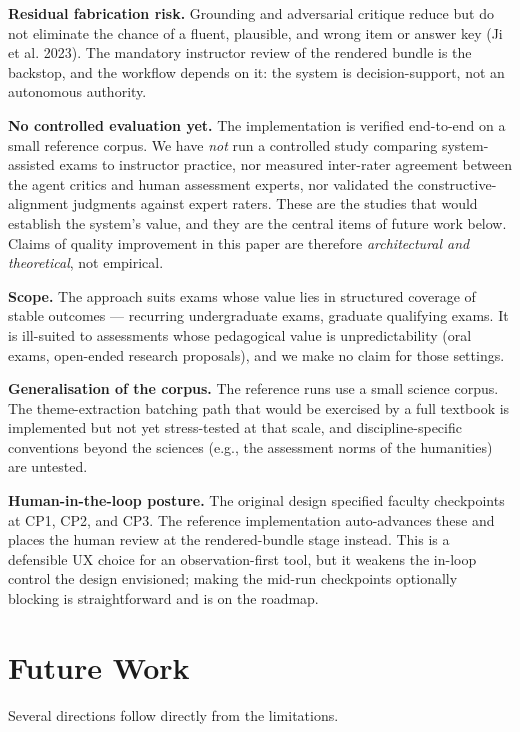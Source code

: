 \documentclass[
  11pt,
  letterpaper,
]{article}
\begin{document}
\textbf{Residual fabrication risk.} Grounding and adversarial critique
reduce but do not eliminate the chance of a fluent, plausible, and wrong
item or answer key (Ji et al. 2023). The mandatory instructor review of
the rendered bundle is the backstop, and the workflow depends on it: the
system is decision-support, not an autonomous authority.

\textbf{No controlled evaluation yet.} The implementation is verified
end-to-end on a small reference corpus. We have \emph{not} run a
controlled study comparing system-assisted exams to instructor practice,
nor measured inter-rater agreement between the agent critics and human
assessment experts, nor validated the constructive-alignment judgments
against expert raters. These are the studies that would establish the
system's value, and they are the central items of future work below.
Claims of quality improvement in this paper are therefore
\emph{architectural and theoretical}, not empirical.

\textbf{Scope.} The approach suits exams whose value lies in structured
coverage of stable outcomes --- recurring undergraduate exams, graduate
qualifying exams. It is ill-suited to assessments whose pedagogical
value is unpredictability (oral exams, open-ended research proposals),
and we make no claim for those settings.

\textbf{Generalisation of the corpus.} The reference runs use a small
science corpus. The theme-extraction batching path that would be
exercised by a full textbook is implemented but not yet stress-tested at
that scale, and discipline-specific conventions beyond the sciences
(e.g., the assessment norms of the humanities) are untested.

\textbf{Human-in-the-loop posture.} The original design specified
faculty checkpoints at CP1, CP2, and CP3. The reference implementation
auto-advances these and places the human review at the rendered-bundle
stage instead. This is a defensible UX choice for an observation-first
tool, but it weakens the in-loop control the design envisioned; making
the mid-run checkpoints optionally blocking is straightforward and is on
the roadmap.

\section{Future Work}\label{future-work}

Several directions follow directly from the limitations.
\end{document}

